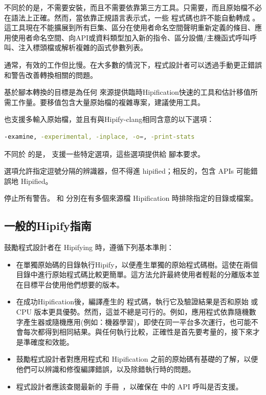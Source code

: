 不同於的是，不需要安裝，而且不需要依靠第三方工具。只需要，而且原始檔不必在語法上正確。然而，當依靠正規語言表示式，一些  程式碼也許不能自動轉成 。這工具現在不能擴展到所有巨集、區分在使用者命名空間聲明重新定義的條目、應用使用者命名空間、向API或資料類型加入新的指令、區分設備/主機函式呼叫呼叫、注入標頭檔或解析複雜的函式參數列表。

通常，有效的工作但比慢。在大多數的情況下，程式設計者可以透過手動更正錯誤和警告改善轉換相關的問題。

基於腳本轉換的目標是為任何  來源提供臨時Hipification快速的工具和估計移值所需工作量。要移值包含大量原始檔的複雜專案，建議使用工具。

也支援多輸入原始檔，並且有與Hipify-clang相同含意的以下選項：

\begin{lstlisting}[language=bash]
-examine, -experimental, -inplace, -o=, -print-stats
\end{lstlisting}

不同於  的是， 支援一些特定選項，這些選項提供給  腳本要求。

 選項允許指定逗號分隔的辨識器，但不得進 hipified；相反的，包含 APIs 可能錯誤地 Hipified。

 停止所有警告。 和  分別在有多個來源檔 Hipification 時排除指定的目錄或檔案。

\subsection{一般的Hipify指南}

鼓勵程式設計者在 Hipifying  時，遵循下列基本準則：
\begin{itemize}
    \item 在單獨原始碼的目錄執行Hipify，以便產生單獨的原始程式碼樹。這使在兩個目錄中進行原始程式碼比較更簡單。這方法允許最終使用者輕鬆的分離版本並在目標平台使用他們想要的版本。
    \item 在成功Hipification後，編譯產生的  程式碼，執行它及驗證結果是否和原始  或 CPU 版本更具優勢。然而，這並不總是可行的。例如，應用程式依靠隨機數字產生器或隨機應用(例如：機器學習)，即使在同一平台多次運行，也可能不會每次都得到相同結果。與任何執行比較，正確性是首先要考量的，接下來才是準確度和效能。
    \item 鼓勵程式設計者對應用程式和 Hipification 之前的原始碼有基礎的了解，以便他們可以辨識和修復編譯錯誤，以及除錯執行時的問題。
    \item 程式設計者應該查閱最新的  手冊~\cite{HIP-Supported-API}，以確保在  中的 API 呼叫是否支援。
\end{itemize}

